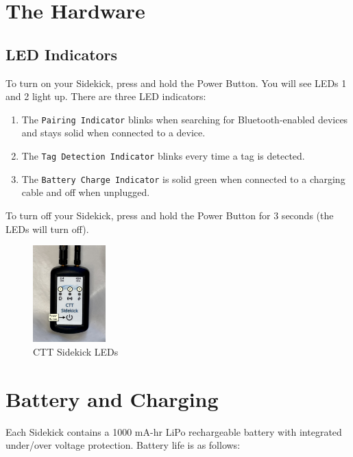 \documentclass[
]{article}
\providecommand{\tightlist}{%
  \setlength{\itemsep}{0pt}\setlength{\parskip}{0pt}}
\begin{document}
\hypertarget{the-hardware}{%
\section{The Hardware}\label{the-hardware}}

\hypertarget{led-indicators}{%
\subsection{LED Indicators}\label{led-indicators}}

To turn on your Sidekick, press and hold the Power Button. You will see
LEDs 1 and 2 light up. There are three LED indicators:

\begin{enumerate}
\def\labelenumi{\arabic{enumi}.}
\tightlist
\item
  The \texttt{Pairing\ Indicator} blinks when searching for
  Bluetooth-enabled devices and stays solid when connected to a device.
\item
  The \texttt{Tag\ Detection\ Indicator} blinks every time a tag is
  detected.
\item
  The \texttt{Battery\ Charge\ Indicator} is solid green when connected
  to a charging cable and off when unplugged.
\end{enumerate}

To turn off your Sidekick, press and hold the Power Button for 3 seconds
(the LEDs will turn off).

\begin{figure}
\hypertarget{id}{%
\centering
\includegraphics[width=0.25\textwidth,height=\textheight]{./images/Sidekick_LEDs.jpg}
\caption{CTT Sidekick LEDs}\label{id}
}
\end{figure}

\hypertarget{battery-and-charging}{%
\section{Battery and Charging}\label{battery-and-charging}}

Each Sidekick contains a 1000 mA-hr LiPo rechargeable battery with
integrated under/over voltage protection. Battery life is as follows:
\end{document}
